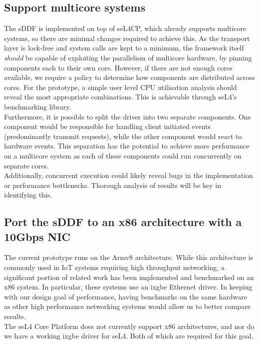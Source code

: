\subsection{Support multicore systems}\label{s:multicore}
The sDDF is implemented on top of seL4CP, which already supports multicore systems, so there are minimal changes required
to achieve this. As the transport layer is lock-free and system calls are kept to a minimum, the framework itself 
\emph{should} be capable of exploiting the parallelism of multicore hardware, by pinning components each to their 
own core. However, if there are not enough cores available, we require a policy to determine how components are distributed
across cores. For the prototype, a simple user level CPU utilisation analysis should reveal the most appropriate combinations.
This is achievable through seL4's benchmarking library.\\
Furthermore, it is possible to split the driver into two separate components. One component would be responsible for
handling client initiated events (predominantly transmit requests), while the other component would react to 
hardware events. This separation has the potential to achieve more performance on a multicore system as
each of these components could run concurrently on separate cores.\\
Additionally, concurrent execution could likely reveal bugs in the implementation or performance bottlenecks. Thorough 
analysis of results will be key in identifying this.

\subsection{Port the sDDF to an x86 architecture with a 10Gbps NIC}\label{s:ixgbe}
The current prototype runs on the Armv8 architecture. While this architecture is commonly used in IoT systems requiring
high throughput networking, a significant portion
of related work has been implemented and benchmarked on an x86 system. In particular, these systems use an ixgbe Ethernet
driver. In keeping with our design goal of performance, having benchmarks on the same hardware as other high performance
networking systems would allow us to better compare results.\\
The seL4 Core Platform does not currently support x86 architectures, and nor do we have a working ixgbe driver for seL4. 
Both of which are required for this goal.
